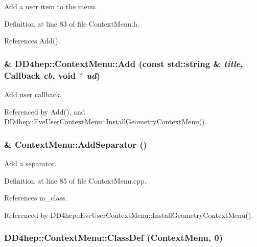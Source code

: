 Add a user item to the menu. 

Definition at line 83 of file ContextMenu.h.

References Add().\hypertarget{class_d_d4hep_1_1_context_menu_a5bfaad4484aed94a2d1298048426e5c1}{
\subsubsection[{Add}]{\& DD4hep::ContextMenu::Add (const std::string \& {\em title}, \/  {\bf Callback} {\em cb}, \/  void $\ast$ {\em ud})}}
\label{class_d_d4hep_1_1_context_menu_a5bfaad4484aed94a2d1298048426e5c1}


Add user callback. 

Referenced by Add(), and DD4hep::EveUserContextMenu::InstallGeometryContextMenu().\hypertarget{class_d_d4hep_1_1_context_menu_a4f500b58c95613e4b6a05a1b31d03a99}{
\subsubsection[{AddSeparator}]{ \& ContextMenu::AddSeparator ()}}
\label{class_d_d4hep_1_1_context_menu_a4f500b58c95613e4b6a05a1b31d03a99}


Add a separator. 

Definition at line 85 of file ContextMenu.cpp.

References m\_\-class.

Referenced by DD4hep::EveUserContextMenu::InstallGeometryContextMenu().\hypertarget{class_d_d4hep_1_1_context_menu_a2f6ab4ffe0c386047b6922c267e0fba7}{
\subsubsection[{ClassDef}]{\setlength{\rightskip}{0pt plus 5cm}DD4hep::ContextMenu::ClassDef ({\bf ContextMenu}, \/  0)}}
\label{class_d_d4hep_1_1_context_menu_a2f6ab4ffe0c386047b6922c267e0fba7}


